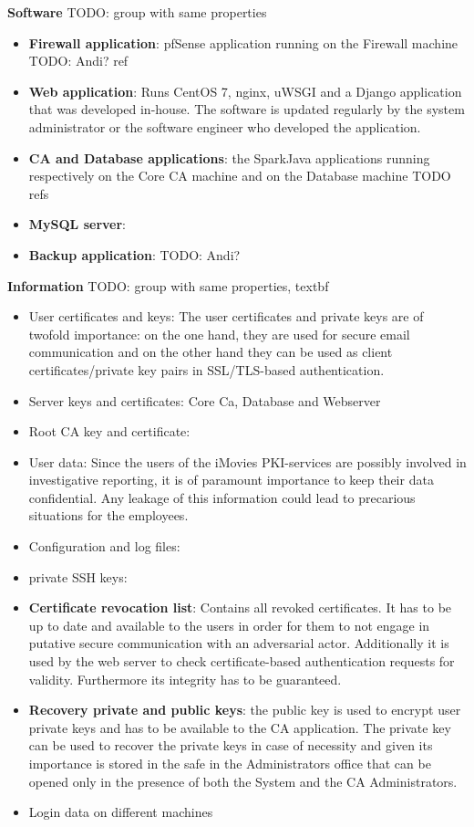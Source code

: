 \documentclass[english]{article}
\begin{document}
\textbf{Software}
TODO: group with same properties
\begin{itemize}
\item \textbf{Firewall application}: pfSense application running on the Firewall machine TODO: Andi? ref
\item \textbf{Web application}: Runs CentOS 7, nginx, uWSGI and a Django application that was developed in-house. The software is updated regularly by the system administrator or the software engineer who developed the application. 
\item \textbf{CA and Database applications}: the SparkJava applications running respectively on the Core CA machine and on the Database machine TODO refs
\item \textbf{MySQL server}:
\item \textbf{Backup application}: TODO: Andi?
\end{itemize}

\noindent\textbf{Information}
TODO: group with same properties, textbf
\begin{itemize}
\item User certificates and keys: The user certificates and private keys are of twofold importance: on the one hand, they are used for secure email communication and on the other hand they can be used as client certificates/private key pairs
in SSL/TLS-based authentication. 
\item Server keys and certificates: Core Ca, Database and Webserver
\item Root CA key and certificate:
\item User data: Since the users of the iMovies PKI-services are possibly involved in investigative reporting, it is of paramount importance to keep their data confidential. Any leakage of this information could
lead to precarious situations for the employees.
\item Configuration and log files:
\item private SSH keys:
\item \textbf{Certificate revocation list}: Contains all revoked certificates. It has to be up to date and available to the users in order for them to not engage in putative secure communication with an adversarial actor.
Additionally it is used by the web server to check certificate-based authentication requests for validity. Furthermore its integrity has to be guaranteed.
\item \textbf{Recovery private and public keys}: the public key is used to encrypt user private keys and has to be available to the CA application. The private key can be used to recover the private keys in case of necessity and given its importance is stored in the safe in the Administrators office that can be opened only in the presence of both the System and the CA Administrators.
\item Login data on different machines
\end{itemize}
\end{document}
